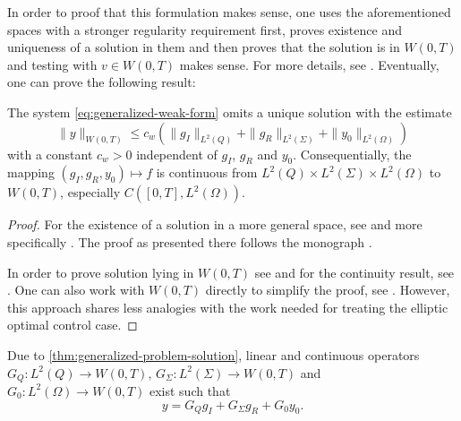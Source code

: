 \documentclass[../thesis.tex]{subfiles}
\begin{document}
In order to proof that this formulation makes sense, one uses the aforementioned spaces with a stronger regularity requirement first, proves existence and uniqueness of a solution in them and then proves that the solution is in $W(0, T)$ and testing with $v \in W(0, T)$ makes sense. For more details, see \cite[3.3 Schwache Lösungen in $W^{1, 0}_2(Q)$]{Troeltzsch}.
Eventually, one can prove the following result:
\begin{theorem}
\label{thm:generalized-problem-solution}
The system \cref{eq:generalized-weak-form} omits a unique solution with the estimate
\[
	\| y \|_{W(0, T)} \leq c_w ( \| g_I \|_{L^2(Q)} + \| g_R \|_{L^2(\Sigma)} + \| y_0 \|_{L^2(\Omega)} )
\] 
with a constant $c_w > 0$ independent of $g_I$, $g_R$ and $y_0$.
Consequentially, the mapping $(g_I, g_R, y_0) \mapsto f$ is continuous from $L^2(Q) \times L^2(\Sigma) \times L^2(\Omega)$ to $W(0, T)$, especially $C([0, T], L^2(\Omega))$.
\end{theorem}
\begin{proof}
For the existence of a solution in a more general space, see \cite[Satz 3.9, p.\ 112]{Troeltzsch} and more specifically \cite[Satz 7.9, p.\ 289]{Troeltzsch}. The proof as presented there follows the monograph \cite{Ladyzhenskaya}.

In order to prove solution lying in $W(0, T)$ see \cite[Satz 3.12, p.\ 120]{Troeltzsch} and for the continuity result, see \cite[Satz 3.13, p.\ 121]{Troeltzsch}.
One can also work with $W(0, T)$ directly to simplify the proof, see \cite{Wloka}. However, this approach shares less analogies with the work needed for treating the elliptic optimal control case.
\end{proof}
Due to \cref{thm:generalized-problem-solution}, linear and continuous operators $G_Q : L^2(Q) \to W(0, T)$, $G_\Sigma : L^2(\Sigma) \to W(0, T)$ and $G_0 : L^2(\Omega) \to W(0, T)$ exist such that
\[
	y = G_Q g_I + G_\Sigma g_R + G_0 y_0.
\]
\end{document}
